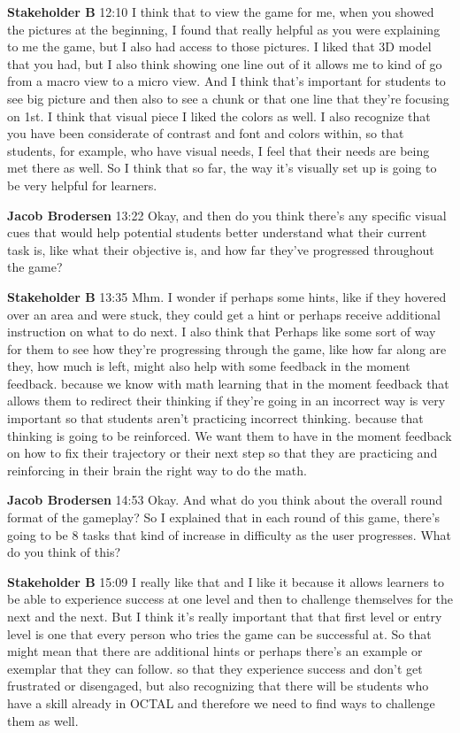 \documentclass{article}
\begin{document}
\noindent \textbf{Stakeholder B}   12:10
I think that to view the game for me, when you showed the pictures at the beginning, I found that really helpful as you were explaining to me the game, but I also had access to those pictures. I liked that 3D model that you had, but I also think showing one line
out of it allows me to kind of go from a macro view to a micro view. And I think that's important for students to see big picture and then also to see a chunk or that one line that they're focusing on 1st. I think that visual piece
I liked the colors as well. I also recognize that you have been considerate of contrast and font and colors within, so that students, for example, who have visual needs, I feel that their needs are being met there as well.
So I think that so far, the way it's visually set up is going to be very helpful for learners.

\noindent \textbf{Jacob Brodersen}   13:22
Okay, and then do you think there's any specific visual cues that would help potential students better understand what their current task is, like what their objective is, and how far they've progressed throughout the game?

\noindent \textbf{Stakeholder B}   13:35
Mhm.
I wonder if perhaps some hints, like if they hovered over an area and were stuck, they could get a hint or perhaps receive additional instruction on what to do next. I also think that
Perhaps like some sort of way for them to see how they're progressing through the game, like how far along are they, how much is left, might also help with some feedback in the moment feedback.
because we know with math learning that in the moment feedback that allows them to redirect their thinking if they're going in an incorrect way is very important so that students aren't practicing incorrect thinking.
because that thinking is going to be reinforced. We want them to have in the moment feedback on how to fix their trajectory or their next step so that they are practicing and reinforcing in their brain the right way to do the math.

\noindent \textbf{Jacob Brodersen}   14:53
Okay. And what do you think about the overall round format of the gameplay? So I explained that in each round of this game, there's going to be 8 tasks that kind of increase in difficulty as the user progresses. What do you think of this?

\noindent \textbf{Stakeholder B}   15:09
I really like that and I like it because it allows learners to be able to experience success at one level and then to challenge themselves for the next and the next.
But I think it's really important that that first level or entry level is one that every person who tries the game can be successful at. So that might mean that there are additional hints or perhaps there's an example or exemplar that they can follow.
so that they experience success and don't get frustrated or disengaged, but also recognizing that there will be students who have a skill already in OCTAL and therefore we need to find ways to challenge them as well.
\end{document}
